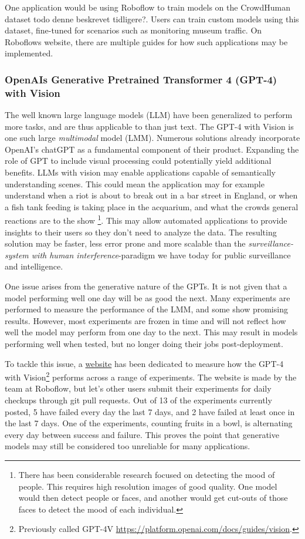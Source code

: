One application would be using Roboflow to train models on the CrowdHuman dataset todo denne beskrevet tidligere?. Users can train custom models using this dataset, fine-tuned for scenarios such as monitoring museum traffic. On Roboflows website, there are multiple guides for how such applications may be implemented.

\subsubsection{OpenAIs Generative Pretrained Transformer 4 (GPT-4) with Vision}
The well known large language models (LLM) have been generalized to perform more tasks, and are thus applicable to than just text. The GPT-4 with Vision is one such large \textit{multimodal} model (LMM). Numerous solutions already incorporate OpenAI's chatGPT as a fundamental component of their product. Expanding the role of GPT to include visual processing could potentially yield additional benefits. LLMs with vision may enable applications capable of semantically understanding scenes. This could mean the application may for example understand when a riot is about to break out in a bar street in England, or when a fish tank feeding is taking place in the acquarium, and what the crowds general reactions are to the show \footnote{There has been considerable research focused on detecting the mood of people. This requires high resolution images of good quality. One model would then detect people or faces, and another would get cut-outs of those faces to detect the mood of each individual.}. This may allow automated applications to provide insights to their users so they don't need to analyze the data. The resulting solution may be faster, less error prone and more scalable than the \textit{surveillance-system with human interference}-paradigm we have today for public surveillance and intelligence.

One issue arises from the generative nature of the GPTs. It is not given that a model performing well one day will be as good the next. Many experiments are performed to measure the performance of the LMM, and some show promising results. However, most experiments are frozen in time and will not reflect how well the model may perform from one day to the next. This may result in models performing well when tested, but no longer doing their jobs post-deployment.

To tackle this issue, a \href{https://www.gptcheckup.com/}{website} has been dedicated to measure how the GPT-4 with Vision\footnote{Previously called GPT-4V \href{https://platform.openai.com/docs/guides/vision}{https://platform.openai.com/docs/guides/vision}.} performs across a range of experiments. The website is made by the team at Roboflow, but let's other users submit their experiments for daily checkups through git pull requests. Out of 13 of the experiments currently posted, 5 have failed every day the last 7 days, and 2 have failed at least once in the last 7 days. One of the experiments, counting fruits in a bowl, is alternating every day between success and failure. This proves the point that generative models may still be considered too unreliable for many applications.

